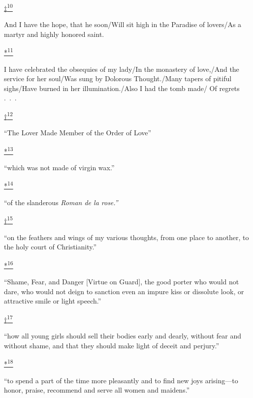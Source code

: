 \protect\hypertarget{23_NOTES.xhtmlux5cux23id_3120}{\protect\hyperlink{11_Chapter_Four__THE_FORMS_OF_LOVE.xhtmlux5cux23id_3119}{‡\textsuperscript{10}}}
And I have the hope, that he soon/Will sit high in the Paradise of
lovers/As a martyr and highly honored saint.

\protect\hypertarget{23_NOTES.xhtmlux5cux23id_3122}{\protect\hyperlink{11_Chapter_Four__THE_FORMS_OF_LOVE.xhtmlux5cux23id_3121}{*\textsuperscript{11}}}
I have celebrated the obsequies of my lady/In the monastery of love,/And
the service for her soul/Was sung by Dolorous Thought./Many tapers of
pitiful sighs/Have burned in her illumination./Also I had the tomb made/
Of regrets .~.~.

\protect\hypertarget{23_NOTES.xhtmlux5cux23id_3124}{\protect\hyperlink{11_Chapter_Four__THE_FORMS_OF_LOVE.xhtmlux5cux23id_3123}{†\textsuperscript{12}}}
``The Lover Made Member of the Order of Love''

\protect\hypertarget{23_NOTES.xhtmlux5cux23id_3126}{\protect\hyperlink{11_Chapter_Four__THE_FORMS_OF_LOVE.xhtmlux5cux23id_3125}{*\textsuperscript{13}}}
``which was not made of virgin wax.''

\protect\hypertarget{23_NOTES.xhtmlux5cux23id_3128}{\protect\hyperlink{11_Chapter_Four__THE_FORMS_OF_LOVE.xhtmlux5cux23id_3127}{*\textsuperscript{14}}}
``of the slanderous \emph{Roman de la rose.''}

\protect\hypertarget{23_NOTES.xhtmlux5cux23id_3130}{\protect\hyperlink{11_Chapter_Four__THE_FORMS_OF_LOVE.xhtmlux5cux23id_3129}{†\textsuperscript{15}}}
``on the feathers and wings of my various thoughts, from one place to
another, to the holy court of Christianity.''

\protect\hypertarget{23_NOTES.xhtmlux5cux23id_3132}{\protect\hyperlink{11_Chapter_Four__THE_FORMS_OF_LOVE.xhtmlux5cux23id_3131}{*\textsuperscript{16}}}
``Shame, Fear, and Danger {[}Virtue on Guard{]}, the good porter who
would not dare, who would not deign to sanction even an impure kiss or
dissolute look, or attractive smile or light speech.''

\protect\hypertarget{23_NOTES.xhtmlux5cux23id_3134}{\protect\hyperlink{11_Chapter_Four__THE_FORMS_OF_LOVE.xhtmlux5cux23id_3133}{†\textsuperscript{17}}}
``how all young girls should sell their bodies early and dearly, without
fear and without shame, and that they should make light of deceit and
perjury.''

\protect\hypertarget{23_NOTES.xhtmlux5cux23id_3136}{\protect\hyperlink{11_Chapter_Four__THE_FORMS_OF_LOVE.xhtmlux5cux23id_3135}{*\textsuperscript{18}}}
``to spend a part of the time more pleasantly and to find new joys
arising---to honor, praise, recommend and serve all women and maidens.''

